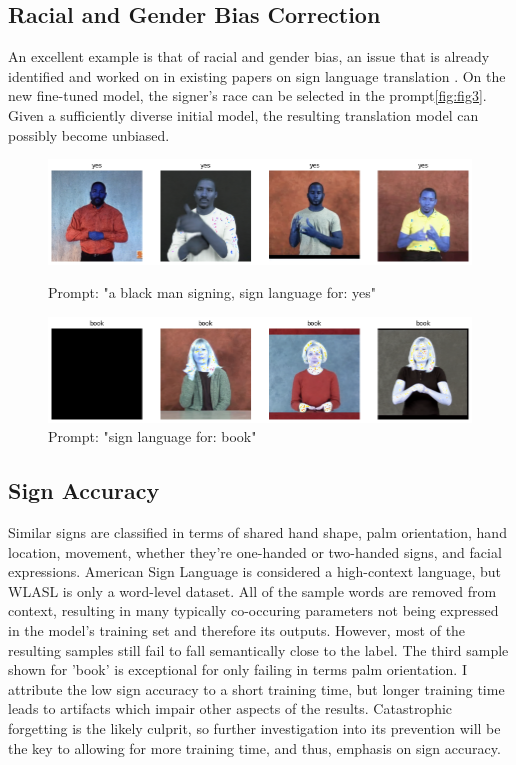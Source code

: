 \documentclass{article}
\begin{document}
\subsection{Racial and Gender Bias Correction}
An excellent example is that of racial and gender bias, an issue that is already identified and worked on in existing papers on sign language translation \cite{8650524}. On the new fine-tuned model, the signer's race can be selected in the prompt\ref{fig:fig3}. Given a sufficiently diverse initial model, the resulting translation model can possibly become unbiased.
\begin{figure}
  \includegraphics[scale=0.5]{black_yes.png}
  \caption{Prompt: "a black man signing, sign language for: yes"}
  \label{fig:fig3}
  \includegraphics[scale=0.5]{lady_book.png}
  \caption{Prompt: "sign language for: book"}
  \label{fig:fig4}
\end{figure}

\subsection{Sign Accuracy}
Similar signs are classified in terms of shared hand shape, palm orientation, hand location, movement, whether they're one-handed or two-handed signs, and facial expressions. American Sign Language is considered a high-context language, but WLASL is only a word-level dataset. All of the sample words are removed from context, resulting in many typically co-occuring parameters not being expressed in the model's training set and therefore its outputs. However, most of the resulting samples still fail to fall semantically close to the label. The third sample shown for 'book' is exceptional for only failing in terms palm orientation. 
I attribute the low sign accuracy to a short training time, but longer training time leads to artifacts which impair other aspects of the results. Catastrophic forgetting is the likely culprit, so further investigation into its prevention will be the key to allowing for more training time, and thus, emphasis on sign accuracy. 
\end{document}
